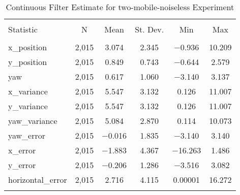 
\begin{table}[h] \centering 
  \caption{Continuous Filter Estimate for two-mobile-noiseless Experiment} 
  \label{tab:two_mobile_noiseless_continuous_summary} 
\begin{tabular}{@{\extracolsep{5pt}}lccccc} 
\\[-1.8ex]\hline 
\hline \\[-1.8ex] 
Statistic & \multicolumn{1}{c}{N} & \multicolumn{1}{c}{Mean} & \multicolumn{1}{c}{St. Dev.} & \multicolumn{1}{c}{Min} & \multicolumn{1}{c}{Max} \\ 
\hline \\[-1.8ex] 
x\_position & 2,015 & 3.074 & 2.345 & $-$0.936 & 10.209 \\ 
y\_position & 2,015 & 0.849 & 0.743 & $-$0.644 & 2.579 \\ 
yaw & 2,015 & 0.617 & 1.060 & $-$3.140 & 3.137 \\ 
x\_variance & 2,015 & 5.547 & 3.132 & 0.126 & 11.007 \\ 
y\_variance & 2,015 & 5.547 & 3.132 & 0.126 & 11.007 \\ 
yaw\_variance & 2,015 & 5.084 & 2.870 & 0.114 & 10.073 \\ 
yaw\_error & 2,015 & $-$0.016 & 1.835 & $-$3.140 & 3.140 \\ 
x\_error & 2,015 & $-$1.883 & 4.367 & $-$16.263 & 1.486 \\ 
y\_error & 2,015 & $-$0.206 & 1.286 & $-$3.516 & 3.082 \\ 
horizontal\_error & 2,015 & 2.716 & 4.115 & 0.00001 & 16.272 \\ 
\hline \\[-1.8ex] 
\end{tabular} 
\end{table} 
